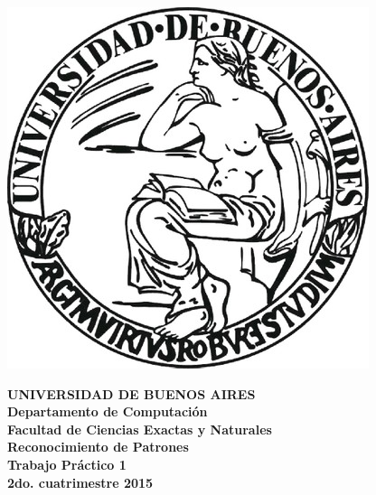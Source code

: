 \documentclass[11pt,a4paper]{article}
\begin{document}

\def\Materia{Reconocimiento de Patrones}
\def\Titulo{Trabajo Pr\'{a}ctico 1}
\def\Fecha{2do. cuatrimestre 2015}


\thispagestyle{empty}

\begin{center}
	\includegraphics[scale = 0.25]{imagenes/logo_uba.jpg}
\end{center}

\begin{center}
	{\textbf{\large UNIVERSIDAD DE BUENOS AIRES}}\\[1.5em]
	{\textbf{\large Departamento de Computaci\'{o}n}}\\[1.5em]
    {\textbf{\large Facultad de Ciencias Exactas y Naturales}}\\
    \vspace{25mm}
    {\LARGE\textbf{\Materia}}\\[1em]    
    \vspace{15mm}
    {\Large \textbf{\Titulo}}\\[1em]
    \vspace{15mm}
    {\textbf{\Large \Fecha}}\\
    \vspace{15mm}
    \textbf{\tablaints}
\end{center}

\newpage
\thispagestyle{empty}
\tableofcontents

\parskip=5pt
\setlength{\parindent}{15pt}

\newpage
\setcounter{page}{1}
\pagestyle{plain}




\end{document}
